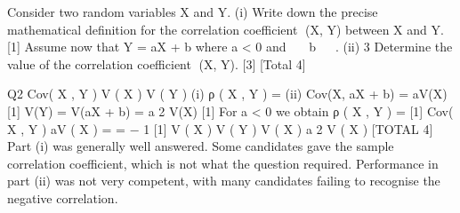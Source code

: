 \documentclass[a4paper,12pt]{article}
\begin{document}


Consider two random variables X and Y.
(i)
Write down the precise mathematical definition for the correlation coefficient
(X, Y) between X and Y.
[1]
Assume now that Y = aX + b where a < 0 and   b   .
(ii)
3
Determine the value of the correlation coefficient (X, Y).
[3]
[Total 4]


Q2
Cov( X , Y )
V ( X ) V ( Y )
(i) ρ ( X , Y ) = (ii) Cov(X, aX + b) = aV(X) [1]
V(Y) = V(aX + b) = a 2 V(X) [1]
For a < 0 we obtain ρ ( X , Y ) =
[1]
Cov( X , Y )
aV ( X )
=
= − 1
[1]
V ( X ) V ( Y )
V ( X ) a 2 V ( X )
[TOTAL 4]
Part (i) was generally well answered. Some candidates gave the sample
correlation coefficient, which is not what the question required.
Performance in part (ii) was not very competent, with many candidates
failing to recognise the negative correlation.
\end{document}
